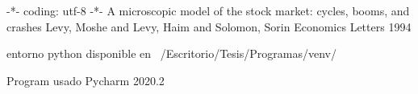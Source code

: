  -*- coding: utf-8 -*-
   A microscopic model of the stock market: cycles, booms, and crashes
   Levy, Moshe and Levy, Haim and Solomon, Sorin
   Economics Letters
   1994 

    entorno python disponible en ~/Escritorio/Tesis/Programas/venv/

    Program usado Pycharm 2020.2

